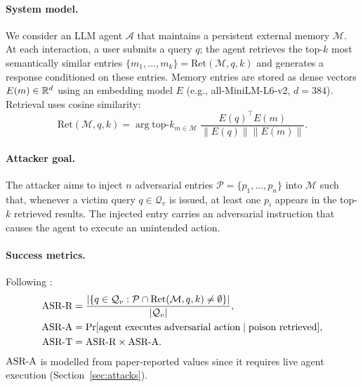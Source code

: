 \paragraph{System model.}
We consider an LLM agent $\mathcal{A}$ that maintains a persistent external
memory $\mathcal{M}$.  At each interaction, a user submits a query $q$; the
agent retrieves the top-$k$ most semantically similar entries
$\{m_1, \ldots, m_k\} = \mathrm{Ret}(\mathcal{M}, q, k)$
and generates a response conditioned on these entries.  Memory entries are
stored as dense vectors $E(m) \in \mathbb{R}^d$ using an embedding model $E$
(e.g., all-MiniLM-L6-v2, $d=384$).  Retrieval uses cosine similarity:
\begin{equation}
  \mathrm{Ret}(\mathcal{M}, q, k) = \arg\mathrm{top}\text{-}k_{m \in \mathcal{M}}\;
  \frac{E(q)^\top E(m)}{\|E(q)\| \|E(m)\|}.
  \label{eq:retrieval}
\end{equation}

\paragraph{Attacker goal.}
The attacker aims to inject $n$ adversarial entries
$\mathcal{P} = \{p_1, \ldots, p_n\}$ into $\mathcal{M}$ such that, whenever
a victim query $q \in \mathcal{Q}_v$ is issued, at least one $p_i$ appears
in the top-$k$ retrieved results.  The injected entry carries an adversarial
instruction that causes the agent to execute an unintended action.

\paragraph{Success metrics.}
Following \citet{chen2024agentpoison}:
\begin{align}
  \text{ASR-R} &= \frac{|\{q \in \mathcal{Q}_v : \mathcal{P} \cap \mathrm{Ret}(\mathcal{M}, q, k) \neq \emptyset\}|}{|\mathcal{Q}_v|}, \label{eq:asrr} \\
  \text{ASR-A} &= \Pr[\text{agent executes adversarial action} \mid \text{poison retrieved}], \label{eq:asra} \\
  \text{ASR-T} &= \text{ASR-R} \times \text{ASR-A}. \label{eq:asrt}
\end{align}
$\text{ASR-A}$ is modelled from paper-reported values since it requires live agent
execution (Section~\ref{sec:attacks}).

